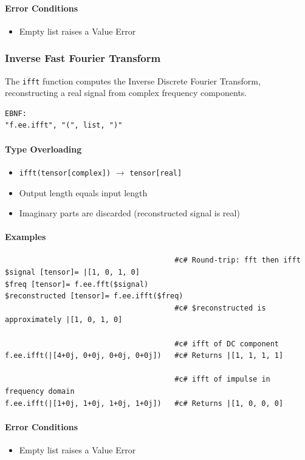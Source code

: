 \paragraph{Error Conditions}
\begin{itemize}
\item Empty list raises a Value Error
\end{itemize}

\subsubsection{Inverse Fast Fourier Transform}
The \texttt{ifft} function computes the Inverse Discrete Fourier Transform, reconstructing a real signal from complex frequency components.
\begin{verbatim}
EBNF:
"f.ee.ifft", "(", list, ")"
\end{verbatim}

\paragraph{Type Overloading}
\begin{itemize}
\item \texttt{ifft(tensor[complex])} $\rightarrow$ \texttt{tensor[real]}
\item Output length equals input length
\item Imaginary parts are discarded (reconstructed signal is real)
\end{itemize}

\paragraph{Examples}
\begin{verbatim}
                                       #c# Round-trip: fft then ifft
$signal [tensor]= |[1, 0, 1, 0]
$freq [tensor]= f.ee.fft($signal)
$reconstructed [tensor]= f.ee.ifft($freq)
                                       #c# $reconstructed is approximately |[1, 0, 1, 0]

                                       #c# ifft of DC component
f.ee.ifft(|[4+0j, 0+0j, 0+0j, 0+0j])   #c# Returns |[1, 1, 1, 1]

                                       #c# ifft of impulse in frequency domain
f.ee.ifft(|[1+0j, 1+0j, 1+0j, 1+0j])   #c# Returns |[1, 0, 0, 0]
\end{verbatim}

\paragraph{Error Conditions}
\begin{itemize}
\item Empty list raises a Value Error
\end{itemize}

